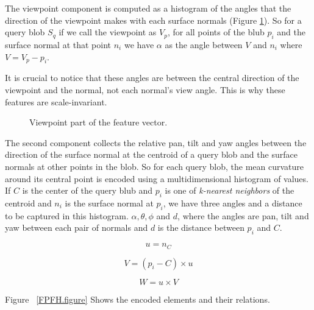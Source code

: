 The viewpoint component is computed as a histogram of the angles that the direction of the viewpoint  makes with each surface
normals (Figure \ref{VFH_ViewPoint_component.figure}). So for a query blob $S_q$ if we call the viewpoint as $V_p$, for all points of the blub $p_i$ and the surface normal at that point $n_i$ we have $\alpha$ as the angle between $V$ and $n_i$ where $V = V_p - p_i$.


It is crucial to notice that these angles are between the central direction of the viewpoint and the normal, not each normal's view angle. This is why these features are scale-invariant.  

\begin{figure}[t]
  \caption[Viewpoint Component of VFH]
  {Viewpoint part of the feature vector.\cite{VFH_Definition}}
  \label{VFH_ViewPoint_component.figure}
\end{figure}

The second component collects the relative pan, tilt and yaw angles between the direction of 
the surface normal at the centroid of a query blob and the surface normals at other points in the blob.
So for each query blob, the mean curvature around its central point is encoded using a multidimensional histogram of values. If $C$ is the center of the query blub and $p_i$ is one of {\it k-nearest neighbors} of the centroid and $n_i$ is the surface normal at $p_i$, we have three angles and a distance to be captured in this histogram. $\alpha,\theta, \phi$ and $d$, where the angles are pan, tilt and yaw between each pair of normals and $d$ is the distance between $p_i$ and $C$.  


\begin{equation}
 \label{VFH_geometry.eq}
    u = n_C
\end{equation}

\begin{equation}
 V = (p_i -C) \times u
\end{equation}

\begin{equation}
 W = u \times V
\end{equation}

    
Figure  ~\ref{FPFH.figure} Shows the encoded elements and their relations.


